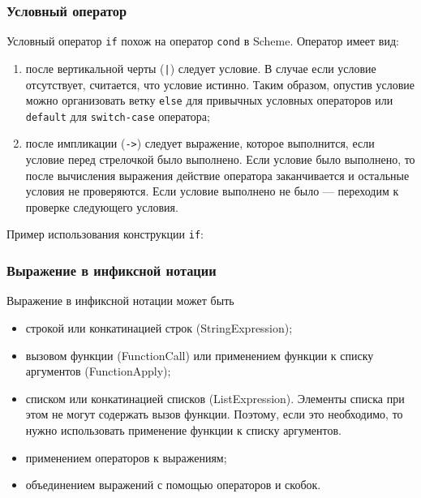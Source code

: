        \subsubsection{Условный оператор}
            Условный оператор \verb$if$ похож на оператор \verb$cond$ в Scheme.
            Оператор имеет вид:
            \begin{enumerate}
                \item после вертикальной черты (\verb,|,) следует условие.
                    В случае если условие отсутствует, считается, что условие истинно.
                    Таким образом, опустив условие можно организовать ветку \verb$else$ для привычных условных операторов
                    или \verb$default$ для \verb$switch-case$ оператора;
                \item после импликации (\verb,->,) следует выражение, которое выполнится, если условие перед стрелочкой было выполнено.
                    Если условие было выполнено, то после вычисления выражения действие оператора заканчивается и остальные условия не проверяются.
                    Если условие выполнено не было --- переходим к проверке следующего условия.
            \end{enumerate}

            

            Пример использования конструкции \verb$if$:

            

        \subsubsection{Выражение в инфиксной нотации}
            Выражение в инфиксной нотации может быть
            \begin{itemize}
                \item строкой или конкатинацией строк (StringExpression);
                \item вызовом функции (FunctionCall) или применением функции к списку аргументов (FunctionApply);
                \item списком или конкатинацией списков (ListExpression).
                    Элементы списка при этом не могут содержать вызов функции.
                    Поэтому, если это необходимо, то нужно использовать применение функции к списку аргументов.
                \item применением операторов к выражениям;
                \item объединением выражений с помощью операторов и скобок.
            \end{itemize}
            
